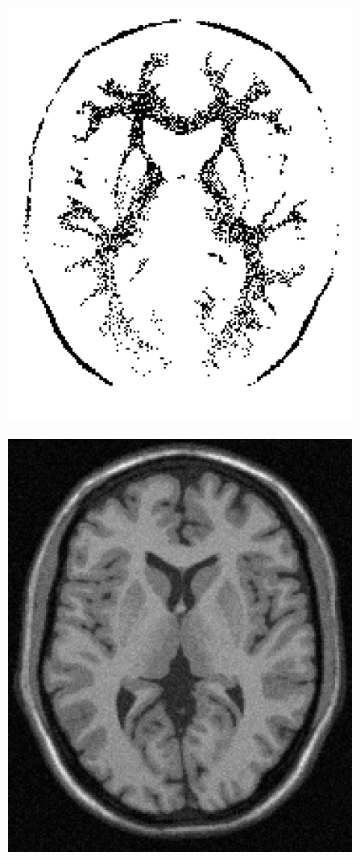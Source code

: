 \documentclass[11pt,twocolumn,twoside]{opticajnl}
\begin{document}
\begin{figure}[h]
\begin{subfigure}[h]{0.24\linewidth}
            \includegraphics[width=\textwidth]{Figuras/ImageA_binary.png}
         \end{subfigure}
         \begin{subfigure}[h]{0.24\linewidth}
            \centering
            \includegraphics[width=\textwidth]{Figuras/sustraction_binary.png}

\end{subfigure}
\end{figure}
\end{document}
